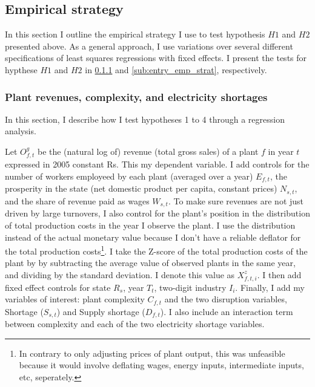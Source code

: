 \documentclass[11pt]{article}
\begin{document}
\subsection{Empirical strategy}\label{sec:emp_strat}

In this section I outline the empirical strategy I use to test hypothesis $H1$ and $H2$ presented above. As a general approach, I use variations over several different specifications of least squares regressions with fixed effects. I present the tests for hypthese $H1$ and $H2$ in \ref{sub:interaction_emp_strat} and \ref{sub:entry_emp_strat}, respectively.

\subsubsection{Plant revenues, complexity, and electricity shortages}\label{sub:interaction_emp_strat}

In this section, I describe how I test hypotheses 1 to 4 through a regression analysis.

Let $O^{g}_{f,t}$ be the (natural log of) revenue (total gross sales) of a plant $f$ in year $t$ expressed in 2005 constant Rs. This my dependent variable. I add controls for the number of workers employeed by each plant (averaged over a year) $E_{f,t}$, the prosperity in the state (net domestic product per capita, constant prices) $N_{s,t}$, and the share of revenue paid as wages $W_{s,t}$. To make sure revenues are not just driven by large turnovers, I also control for the plant's position in the distribution of total production costs in the year I observe the plant. I use the distribution instead of the actual monetary value because I don't have a reliable deflator for the total production costs\footnote{In contrary to only adjusting prices of plant output, this was unfeasible because it would involve deflating wages, energy inputs, intermediate inputs, etc, seperately.}. I take the Z-score of the total production costs of the plant by by subtracting the average value of observed plants in the same year, and dividing by the standard deviation. I denote this value as $X^{z}_{f,t,i}$. I then add fixed effect controls for state $R_{s}$, year $T_{t}$, two-digit industry $I_i$. Finally, I add my variables of interest: plant complexity $C_{f,t}$ and the two disruption variables, Shortage ($S_{s,t}$) and Supply shortage ($D_{f,t}$). I also include an interaction term between complexity and each of the two electricity shortage variables.
\end{document}
